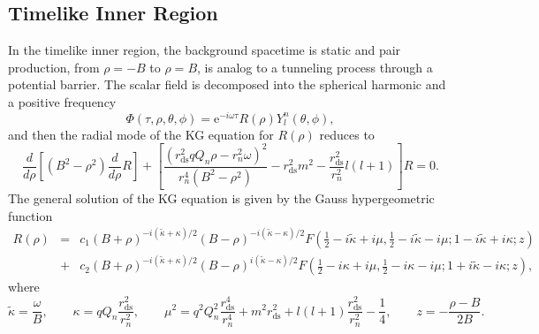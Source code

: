 \documentclass[aps,nofootinbib,superscriptaddress
]{revtex4}
\begin{document}
\subsection{Timelike Inner Region}
In the timelike inner region, the background spacetime is static and pair production, from $\rho = -B$ to $\rho = B$, is analog to a tunneling process through a potential barrier. The scalar field is decomposed into the spherical harmonic and a positive frequency
\begin{equation} \label{ansatzInt}
\Phi(\tau, \rho, \theta, \phi) = \mathrm{e}^{-i \omega \tau} R(\rho) Y_l^n(\theta, \phi),
\end{equation}
and then the radial mode of the KG equation for $R(\rho)$ reduces to
\begin{equation}
\frac{d}{d\rho} \left[ (B^2 - \rho^2) \frac{d}{d\rho} R \right] + \left[ \frac{(r_\mathrm{ds}^2 q Q_n \rho - r_n^2 \omega)^2}{r_n^4 (B^2 - \rho^2)} - r_\mathrm{ds}^2 m^2 - \frac{r_\mathrm{ds}^2}{r_n^2} l (l + 1) \right] R = 0.
\end{equation}
The general solution of the KG equation is given by the Gauss hypergeometric function
\begin{eqnarray}
R(\rho) &=& c_1 (B + \rho)^{-i (\tilde{\kappa} + \kappa)/2} (B - \rho)^{-i (\tilde{\kappa} - \kappa)/2} F\left( \frac12 - i \tilde{\kappa} + i \mu, \frac12 - i \tilde{\kappa} - i \mu; 1 - i \tilde{\kappa} + i \kappa; z \right)
\nonumber\\
&+& c_2 (B + \rho)^{-i (\tilde{\kappa} + \kappa)/2} (B - \rho)^{i (\tilde{\kappa} - \kappa)/2} F\left( \frac12 - i \kappa + i \mu, \frac12 - i \kappa - i \mu; 1 + i \tilde{\kappa} - i \kappa; z \right),
\end{eqnarray}
where
\begin{equation}
\tilde{\kappa} = \frac{\omega}{B}, \qquad \kappa = q Q_n \frac{r_\mathrm{ds}^2}{r_n^2}, \qquad \mu^2 = q^2 Q_n^2 \frac{r_\mathrm{ds}^4}{r_n^4} + m^2 r_\mathrm{ds}^2 + l (l +1) \frac{r_\mathrm{ds}^2}{r_n^2} - \frac14, \qquad z = - \frac{\rho - B}{2 B}.
\end{equation}
\end{document}
